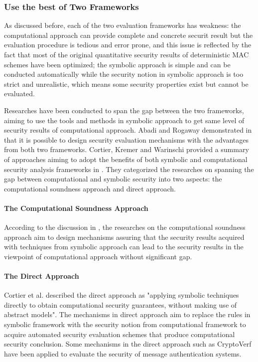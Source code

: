 \documentclass{article}
\begin{document}
\subsubsection{Use the best of Two Frameworks}
As discussed before, each of the two evaluation frameworks has weakness: the computational approach can provide complete and concrete securit result but the evaluation procedure is tedious and error prone, and this issue is reflected by the fact that most of the original quantitative security results of deterministic MAC schemes have been optimized; the symbolic approach is simple and can be conducted automatically while the security notion in symbolic approach is too strict and unrealistic, which means some security properties exist but cannot be evaluated. 

Researches have been conducted to span the gap between the two frameworks, aiming to use the tools and methods in symbolic approach to get same level of security results of computational approach. Abadi and Rogaway demonstrated in \cite{abadi_rogaway} that it is possible to design security evaluation mechanisms with the advantages from both two frameworks. 
Cortier, Kremer and Warinschi provided a summary of approaches aiming to adopt the benefits of both symbolic and computational security analysis frameworks in \cite{survey}. They categorized the researches on spanning the gap between computational and symbolic security into two aspects: the computational soundness approach and direct approach.
\paragraph{The Computational Soundness Approach}
According to the discussion in \cite{survey}, the researches on the computational soundness approach aim to design mechanisms assuring that the security results acquired with techniques from symbolic approach can lead to the security results in the viewpoint of computational approach without significant gap.
\paragraph{The Direct Approach}
Cortier et al. described the direct approach as "applying symbolic techniques directly to obtain computational security guarantees, without making use of abstract models". The mechanisms in direct approach aim to replace the rules in symbolic framework with the security notion from computational framework to acquire automated security evaluation schemes that produce computational security conclusion. Some mechanisms in the direct approach such as CryptoVerf have been applied to evaluate the security of message authentication systems.
\end{document}
